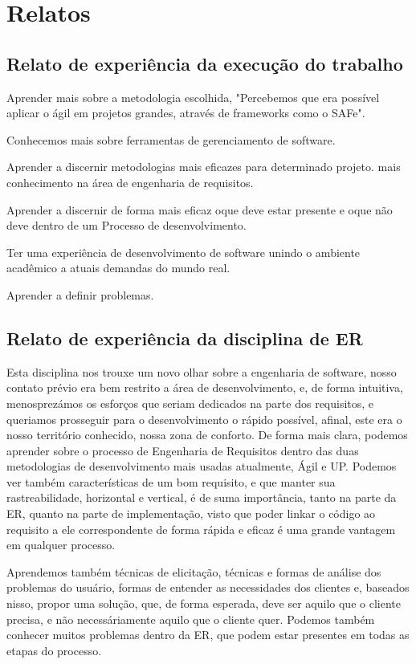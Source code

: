 \chapter{Relatos}

\section{Relato de experiência da execução do trabalho}
  Aprender mais sobre a metodologia escolhida, "Percebemos que era possível aplicar o ágil em projetos grandes, através de frameworks como o SAFe".

  Conhecemos mais sobre ferramentas de gerenciamento de software.

  Aprender a discernir metodologias mais eficazes para determinado projeto.
  mais conhecimento na área de engenharia de requisitos.

  Aprender a discernir de forma mais eficaz oque deve estar presente e oque não deve dentro de um Processo de desenvolvimento.

  Ter uma experiência de desenvolvimento de software unindo o ambiente acadêmico a atuais demandas do mundo real.

  Aprender a definir problemas.

\section{Relato de experiência da disciplina de ER}

Esta disciplina nos trouxe um novo olhar sobre a engenharia de software,
nosso contato prévio era bem restrito a área de desenvolvimento, e, de forma intuitiva, menosprezámos os esforços
que seriam dedicados na parte dos requisitos, e queriamos prosseguir para o desenvolvimento o rápido possível,
afinal, este era o nosso território conhecido, nossa zona de conforto.
De forma mais clara, podemos aprender sobre o processo de Engenharia de Requisitos dentro das duas metodologias
de desenvolvimento mais usadas atualmente, Ágil e UP.
Podemos ver também características de um bom requisito, e que manter sua rastreabilidade, horizontal e vertical,
é de suma importância, tanto na parte da ER, quanto na parte de implementação, visto que poder linkar o código
ao requisito a ele correspondente de forma rápida e eficaz é uma grande vantagem em qualquer processo.

Aprendemos também técnicas de elicitação, técnicas e formas de análise dos problemas do usuário,
formas de entender as necessidades dos clientes e, baseados nisso, propor uma solução, que, de forma esperada,
deve ser aquilo que o cliente precisa, e não necessáriamente aquilo que o cliente quer.
Podemos também conhecer muitos problemas dentro da ER, que podem estar presentes em todas as etapas do processo.

